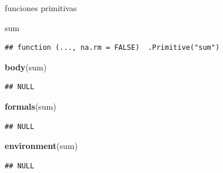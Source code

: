 \documentclass[ignorenonframetext,]{beamer}
\newenvironment{Shaded}{\begin{snugshade}}{\end{snugshade}}
\newcommand{\KeywordTok}[1]{\textcolor[rgb]{0.13,0.29,0.53}{\textbf{#1}}}
\newcommand{\NormalTok}[1]{#1}
\begin{document}
\begin{frame}[fragile]{funciones primitivas}
\protect\hypertarget{funciones-primitivas}{}

\begin{Shaded}
\begin{Highlighting}[]
\NormalTok{sum}
\end{Highlighting}
\end{Shaded}

\begin{verbatim}
## function (..., na.rm = FALSE)  .Primitive("sum")
\end{verbatim}

\begin{Shaded}
\begin{Highlighting}[]
\KeywordTok{body}\NormalTok{(sum)}
\end{Highlighting}
\end{Shaded}

\begin{verbatim}
## NULL
\end{verbatim}

\begin{Shaded}
\begin{Highlighting}[]
\KeywordTok{formals}\NormalTok{(sum)}
\end{Highlighting}
\end{Shaded}

\begin{verbatim}
## NULL
\end{verbatim}

\begin{Shaded}
\begin{Highlighting}[]
\KeywordTok{environment}\NormalTok{(sum)}
\end{Highlighting}
\end{Shaded}

\begin{verbatim}
## NULL
\end{verbatim}

\end{frame}
\end{document}
